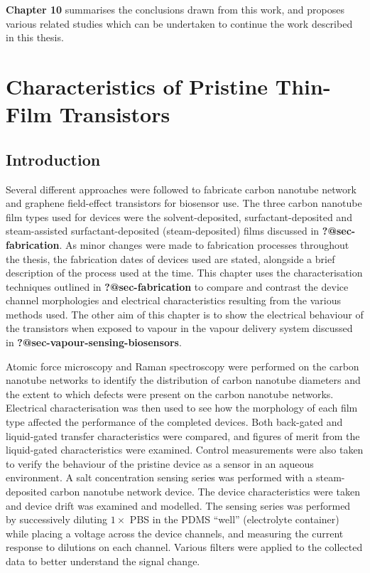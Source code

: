 \documentclass[
  a4paper,
]{scrbook}
\begin{document}
\textbf{Chapter 10} summarises the conclusions drawn from this work, and
proposes various related studies which can be undertaken to continue the
work described in this thesis.


\hypertarget{sec-pristine-characteristics}{%
\chapter{Characteristics of Pristine Thin-Film
Transistors}\label{sec-pristine-characteristics}}

\hypertarget{introduction-1}{%
\section{Introduction}\label{introduction-1}}

Several different approaches were followed to fabricate carbon nanotube
network and graphene field-effect transistors for biosensor use. The
three carbon nanotube film types used for devices were the
solvent-deposited, surfactant-deposited and steam-assisted
surfactant-deposited (steam-deposited) films discussed in
\textbf{?@sec-fabrication}. As minor changes were made to fabrication
processes throughout the thesis, the fabrication dates of devices used
are stated, alongside a brief description of the process used at the
time. This chapter uses the characterisation techniques outlined in
\textbf{?@sec-fabrication} to compare and contrast the device channel
morphologies and electrical characteristics resulting from the various
methods used. The other aim of this chapter is to show the electrical
behaviour of the transistors when exposed to vapour in the vapour
delivery system discussed in \textbf{?@sec-vapour-sensing-biosensors}.

Atomic force microscopy and Raman spectroscopy were performed on the
carbon nanotube networks to identify the distribution of carbon nanotube
diameters and the extent to which defects were present on the carbon
nanotube networks. Electrical characterisation was then used to see how
the morphology of each film type affected the performance of the
completed devices. Both back-gated and liquid-gated transfer
characteristics were compared, and figures of merit from the
liquid-gated characteristics were examined. Control measurements were
also taken to verify the behaviour of the pristine device as a sensor in
an aqueous environment. A salt concentration sensing series was
performed with a steam-deposited carbon nanotube network device. The
device characteristics were taken and device drift was examined and
modelled. The sensing series was performed by successively diluting
\(1 \times\) PBS in the PDMS ``well'' (electrolyte container) while
placing a voltage across the device channels, and measuring the current
response to dilutions on each channel. Various filters were applied to
the collected data to better understand the signal change.
\end{document}
